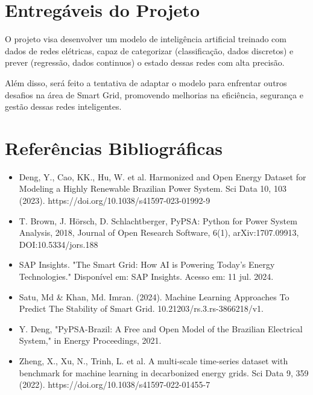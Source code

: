 \documentclass[a4paper,12pt]{article}
\begin{document}
\section{Entregáveis do Projeto}

O projeto visa desenvolver um modelo de inteligência artificial treinado com dados de redes elétricas, capaz de categorizar (classificação, dados discretos) e prever (regressão, dados continuos) o estado dessas redes com alta precisão.

Além disso, será feito a tentativa de adaptar o modelo para enfrentar outros desafios na área de Smart Grid, promovendo melhorias na eficiência, segurança e gestão dessas redes inteligentes.

\section{Referências Bibliográficas}
\begin{itemize}
    \item Deng, Y., Cao, KK., Hu, W. et al. Harmonized and Open Energy Dataset for Modeling a Highly Renewable Brazilian Power System. Sci Data 10, 103 (2023). https://doi.org/10.1038/s41597-023-01992-9
    \item T. Brown, J. Hörsch, D. Schlachtberger, PyPSA: Python for Power System Analysis, 2018, Journal of Open Research Software, 6(1), arXiv:1707.09913, DOI:10.5334/jors.188
    \item SAP Insights. "The Smart Grid: How AI is Powering Today’s Energy Technologies." Disponível em: SAP Insights. Acesso em: 11 jul. 2024.
    \item Satu, Md \& Khan, Md. Imran. (2024). Machine Learning Approaches To Predict The Stability of Smart Grid. 10.21203/rs.3.rs-3866218/v1.
    \item Y. Deng, "PyPSA-Brazil: A Free and Open Model of the Brazilian Electrical System," in Energy Proceedings, 2021.
    \item Zheng, X., Xu, N., Trinh, L. et al. A multi-scale time-series dataset with benchmark for machine learning in decarbonized energy grids. Sci Data 9, 359 (2022). https://doi.org/10.1038/s41597-022-01455-7
\end{itemize}
\end{document}
